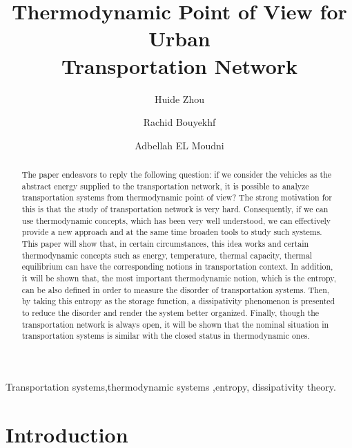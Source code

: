 \documentclass[preprint,authoryear,12pt]{elsarticle}
\begin{document}
\begin{frontmatter}

\title{Thermodynamic Point of View for Urban\\ Transportation Network}
\author[SeT]{Huide Zhou}
\author[SeT]{Rachid Bouyekhf}
\author[SeT]{Adbellah EL Moudni}
\address[SeT]{Laboratoire Syst\`{e}mes et Transports (SeT),\\
Universit\'{e} de Technologie de Belfort-Montb\'{e}liard (UTBM)\\
Rue Thierry Mieg, 90010 Belfort Cedex, France}

\begin{abstract}
The paper endeavors to reply the following question: if we consider
the vehicles as the abstract energy supplied to the transportation
network, it is possible to analyze transportation systems from
thermodynamic point of view? The strong motivation for this is that
the study of transportation network is very hard. Consequently, if we
can use thermodynamic concepts, which has been very well understood,
we can effectively provide a new approach and at the same time
broaden  tools  to study such systems. This paper will show that, in
certain circumstances, this idea works and certain thermodynamic
concepts such as energy, temperature, thermal capacity, thermal
equilibrium can have the corresponding notions in transportation
context. In addition, it will be shown that, the most important
thermodynamic notion, which is the entropy, can be also defined in
order to measure the disorder of transportation systems. Then, by
taking this entropy as the storage function, a dissipativity
phenomenon is presented to reduce the disorder and render the system
better organized. Finally, though the transportation network is
always open, it will be shown that the nominal situation in
transportation systems is similar with the closed status in
thermodynamic ones.
\end{abstract}

\begin{keyword}
Transportation systems\sep thermodynamic systems \sep entropy\sep
dissipativity theory.
\end{keyword}

\end{frontmatter}

\section{Introduction}
\end{document}
